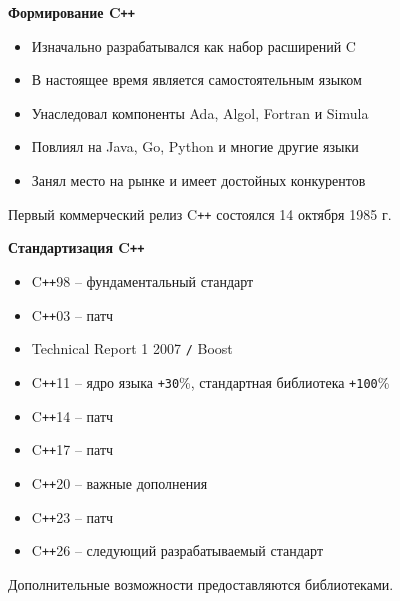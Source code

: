 \documentclass{beamer} %
\begin{document}
\begin{frame}{\bf Формирование C\texttt{++}}
    
    \begin{itemize}

        \item Изначально разрабатывался как набор расширений C

        \item В настоящее время является самостоятельным языком

        \item Унаследовал компоненты Ada, Algol, Fortran и Simula

        \item Повлиял на Java, Go, Python и многие другие языки

        \item Занял место на рынке и имеет достойных конкурентов
         
    \end{itemize}

    \begin{block}
    \justifying Первый коммерческий релиз C\texttt{++} состоялся 14 октября 1985 г.
    \end{block}
    
\end{frame}

\begin{frame}{\bf Стандартизация C\texttt{++}}

    \begin{itemize}

        \item C\texttt{++}98 -- фундаментальный стандарт

        \item C\texttt{++}03 -- патч

        \item Technical Report 1 2007 \texttt{/} Boost

        \item C\texttt{++}11 -- ядро языка \texttt{+30}\%, стандартная библиотека \texttt{+100}\%

        \item C\texttt{++}14 -- патч

        \item C\texttt{++}17 -- патч

        \item C\texttt{++}20 -- важные дополнения

        \item C\texttt{++}23 -- патч

        \item C\texttt{++}26 -- следующий разрабатываемый стандарт
         
    \end{itemize}

    \begin{block}
    \justifying Дополнительные возможности предоставляются библиотеками.
    \end{block}
    
\end{frame}
\end{document}
